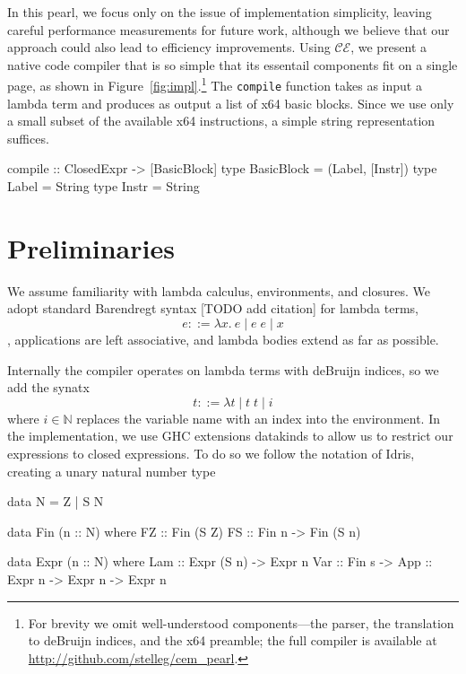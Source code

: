 \documentclass[preprint]{sigplanconf}
\begin{document}
In this pearl, we focus only on the issue of implementation simplicity, leaving
careful performance measurements for future work, although we believe that our
approach could also lead to efficiency improvements.
Using $\mathcal{CE}$, we present a native code compiler that is so
simple that its essentail components fit on a single page, as shown in
Figure~\ref{fig:impl}.\footnote{For brevity we omit well-understood components---the
parser, the translation to deBruijn indices, and the x64 preamble;
the full compiler is available at \url{http://github.com/stelleg/cem_pearl}.}
The \texttt{compile} function takes as input a lambda term and produces as
output a list of x64 basic blocks. Since we use only a small subset of the
available x64 instructions, a simple string representation suffices.

\begin{code}
compile :: ClosedExpr -> [BasicBlock]
type BasicBlock = (Label, [Instr])
type Label = String
type Instr = String
\end{code}

\section{Preliminaries}
We assume familiarity with lambda calculus, environments, and closures.
We adopt standard Barendregt syntax [TODO add citation] for lambda terms,
$$ e ::=  \lambda x.\ e \; | \; e \;  e \; | \;
x $$, applications are left
associative, and lambda bodies extend as far as possible. 

Internally the compiler operates on lambda terms with deBruijn indices,
so we add the synatx $$ t ::= \lambda t \; | \; t \;
t \; | \; i $$ where $i \in \mathbb{N}$ replaces the variable name with an index
into the environment. In the implementation, we use GHC extensions datakinds to
allow us to restrict our expressions to closed expressions. To do so we follow
the notation of Idris, creating a unary natural number type 

\begin{code}
data N = Z | S N

data Fin (n :: N) where
  FZ :: Fin (S Z)
  FS :: Fin n -> Fin (S n)

data Expr (n :: N)  where
  Lam :: Expr (S n) -> Expr n 
  Var :: Fin s -> 
  App :: Expr n -> Expr n -> Expr n
\end{code}
\end{document}
